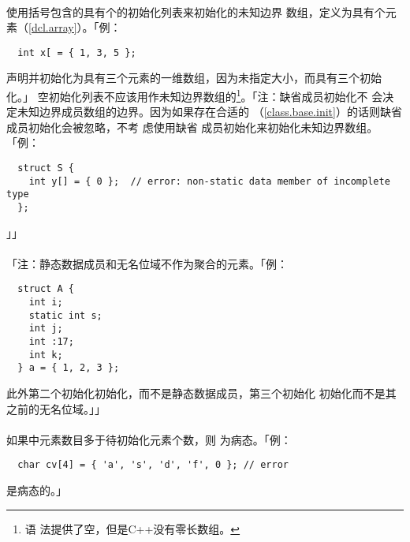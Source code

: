 \paragraph{}
使用括号包含的具有个的初始化列表来初始化的未知边界
数组，定义为具有个元素（\ref{dcl.array}）。「例：
\begin{lstlisting}
  int x[ = { 1, 3, 5 };
\end{lstlisting}
声明并初始化为具有三个元素的一维数组，因为未指定大小，而具有三个初始化。」
空初始化列表\tm{\{\}}不应该用作未知边界数组的\footnote{语
法提供了空，但是C++没有零长数组。}。「注：缺省成员初始化不
会决定未知边界成员数组的边界。因为如果存在合适的
（\ref{class.base.init}）的话则缺省成员初始化会被忽略，不考
虑使用缺省
成员初始化来初始化未知边界数组。「例：
\begin{lstlisting}
  struct S {
    int y[] = { 0 };  // error: non-static data member of incomplete type
  };
\end{lstlisting}」」

\paragraph{}
「注：静态数据成员和无名位域不作为聚合的元素。「例：
\begin{lstlisting}
  struct A {
    int i;
    static int s;
    int j;
    int :17;
    int k;
  } a = { 1, 2, 3 };
\end{lstlisting}
此外第二个初始化初始化，而不是静态数据成员，第三个初始化
初始化而不是其之前的无名位域。」」

\paragraph{}
如果中元素数目多于待初始化元素个数，则
为病态。「例：
\begin{lstlisting}
  char cv[4] = { 'a', 's', 'd', 'f', 0 }; // error
\end{lstlisting}
是病态的。」

